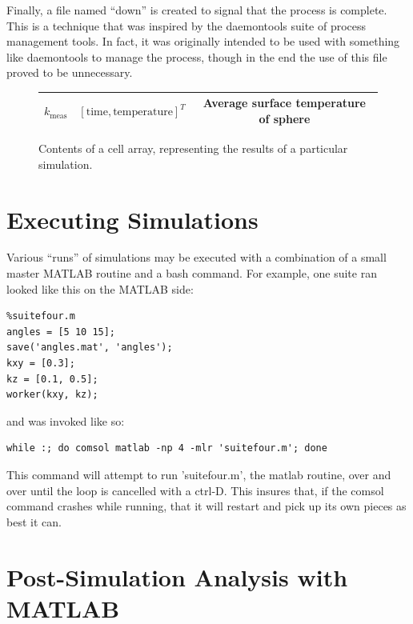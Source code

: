 Finally, a file named ``down'' is created to signal that the process is
complete. This is a technique that was inspired by the daemontools suite of
process management tools. In fact, it was originally intended to be used with
something like daemontools to manage the process, though in the end the use of this file proved
to be unnecessary.

\begin{figure}
\label{fig:cellarray}

\centering
\begin{tabular}{| c | c | c |}
\hline
\(k_\textrm{meas}\) & \( \left[ \textrm{time}, \textrm{temperature} \right]^T\) & Average surface temperature of sphere\\
\hline
\end{tabular}
\caption{Contents of a cell array, representing the results of a particular simulation.}
\end{figure}

\section{Executing Simulations}

Various ``runs'' of simulations may be executed with a combination of a
small master MATLAB routine and a bash command. For example, one suite ran
looked like this on the MATLAB side:

\small
\begin{verbatim}
%suitefour.m
angles = [5 10 15];
save('angles.mat', 'angles');
kxy = [0.3];
kz = [0.1, 0.5];
worker(kxy, kz);
\end{verbatim}
\normalsize 

and was invoked like so:

\small
\begin{verbatim}
while :; do comsol matlab -np 4 -mlr 'suitefour.m'; done
\end{verbatim}
\normalsize

This command will attempt to run 'suitefour.m', the matlab routine, over and over until the loop is cancelled with a
ctrl-D. This insures that, if the comsol command crashes while running,
that it will restart and pick up its own pieces as best it can.

\section{Post-Simulation Analysis with MATLAB}


